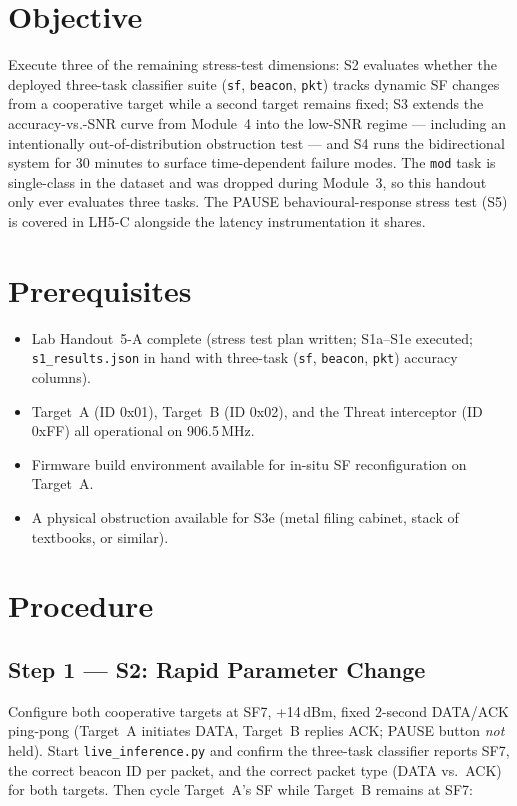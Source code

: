 \documentclass[11pt,letterpaper]{article}
\begin{document}

\section{Objective}
Execute three of the remaining stress-test dimensions: S2 evaluates whether the deployed three-task classifier suite (\texttt{sf}, \texttt{beacon}, \texttt{pkt}) tracks dynamic SF changes from a cooperative target while a second target remains fixed; S3 extends the accuracy-vs.-\mbox{SNR} curve from Module~4 into the low-\mbox{SNR} regime --- including an intentionally out-of-distribution obstruction test --- and S4 runs the bidirectional system for 30 minutes to surface time-dependent failure modes. The \texttt{mod} task is single-class in the dataset and was dropped during Module~3, so this handout only ever evaluates three tasks. The PAUSE behavioural-response stress test (S5) is covered in LH5-C alongside the latency instrumentation it shares.

\section{Prerequisites}
\begin{itemize}[leftmargin=2em]
	\item Lab Handout~5-A complete (stress test plan written; S1a--S1e executed; \texttt{s1\_results.json} in hand with three-task (\texttt{sf}, \texttt{beacon}, \texttt{pkt}) accuracy columns).
	\item Target~A (ID 0x01), Target~B (ID 0x02), and the Threat interceptor (ID 0xFF) all operational on 906.5\,MHz.
	\item Firmware build environment available for in-situ SF reconfiguration on Target~A.
	\item A physical obstruction available for S3e (metal filing cabinet, stack of textbooks, or similar).
\end{itemize}

\section{Procedure}

\subsection{Step 1 --- S2: Rapid Parameter Change}
Configure both cooperative targets at SF7, +14\,dBm, fixed 2-second DATA/ACK ping-pong (Target~A initiates DATA, Target~B replies ACK; PAUSE button \emph{not} held). Start \texttt{live\_inference.py} and confirm the three-task classifier reports SF7, the correct beacon ID per packet, and the correct packet type (DATA vs.\ ACK) for both targets. Then cycle Target~A's SF while Target~B remains at SF7:
\end{document}
